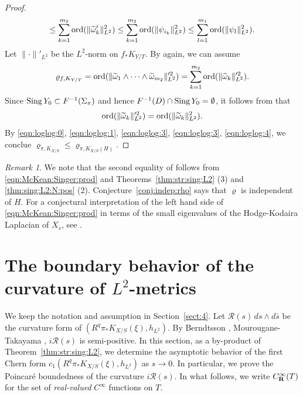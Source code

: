 \documentclass[amscd, leqno]{amsart}
\theoremstyle{plain}
\theoremstyle{definition}
\theoremstyle{remark}
\newtheorem{remark}[theorem]{Remark}
\newenvironment{pf}{\begin{proof}}{\end{proof}}
\begin{document}
\begin{pf}
\begin{equation}
\leq
\sum_{k=1}^{m_{2}} {\rm ord}(  \| \widetilde{\omega}'_{k} \|_{L^{2}}^{2}) 
\leq
\sum_{k=1}^{m_{2}} {\rm ord}(  \| \psi_{i_k} \|_{L^{2}}^{2}) 
\leq 
\sum_{l=1}^{m_{1}} {\rm ord}(  \| \psi_{l} \|_{L^{2}}^{2}). 
\end{equation}
Let $\| \cdot \|'_{L^{2}}$ be the $L^{2}$-norm on $f_{*}K_{Y/T}$. By \cite[Lemma~5.2]{Takayama22} again, we can assume 
\begin{equation}
\label{eqn:loglog:3}
\varrho_{f,K_{Y/T}} 
=
{\rm ord}(\| \widetilde{\omega}_{1} \wedge\cdots\wedge \widetilde{\omega}_{m_{2}} \|_{L^{2}}^{\prime 2})
= 
\sum_{k=1}^{m_{2}} {\rm ord}(\| \widetilde{\omega}_{k}\|_{L^{2}}^{\prime 2}).
\end{equation}
Since ${\rm Sing}\,Y_{0} \subset F^{-1}(\Sigma_{\pi})$ and hence $F^{-1}(D) \cap {\rm Sing}\,Y_{0} = \emptyset$, 
it follows from \cite[Lemma\,3.4]{Takayama22} that
\begin{equation}
\label{eqn:loglog:4}
{\rm ord}(\| \widetilde{\omega}_{k}\|_{L^{2}}^{\prime 2}) = {\rm ord}(\| \widetilde{\omega}_{k}\|_{L^{2}}^{2}).
\end{equation}
By \eqref{eqn:loglog:0}, \eqref{eqn:loglog:1}, \eqref{eqn:loglog:3}, \eqref{eqn:loglog:3}, \eqref{eqn:loglog:4}, 
we conclue $\varrho_{\pi,K_{X/S}} \leq \varrho_{\pi,K_{X/S}(H)}$. 
\end{pf}


\begin{remark}
We note that the second equality of \cite[Conjecture~9.6]{DaiYoshikawa25} follows from \eqref{eqn:McKean:Singer:prod} and
Theorems~\ref{thm:str:sing:L2} (3) and \ref{thm:sing:L2:N:pos} (2). Conjecture~\ref{conj:indep:rho} says that $\varrho$ is independent of $H$. 
For a conjectural interpretation of the left hand side of \eqref{eqn:McKean:Singer:prod} in terms of the small eigenvalues of 
the Hodge-Kodaira Laplacian of $X_{s}$, see \cite[Conjecture~9.6 ]{DaiYoshikawa25}.
\end{remark}





\section
{The boundary behavior of the curvature of $L^{2}$-metrics}
\label{sect:8}
\par
We keep the notation and assumption in Section~\ref{sect:4}.
Let ${\mathcal R}(s)\,ds\wedge d\bar{s}$ be the curvature form of $(R^{q}\pi_{*}K_{X/S}(\xi), h_{L^{2}})$. 
By Berndtsson \cite{Berndtsson09}, Mourougane-Takayama \cite{MourouganeTakayama08}, $i{\mathcal R}(s)$ is semi-positive. 
In this section, as a by-product of Theorem~\ref{thm:str:sing:L2}, we determine the asymptotic behavior of the first Chern form 
$c_{1}(R^{q}\pi_{*}K_{X/S}(\xi),h_{L^{2}})$ as $s \to 0$. In particular, we prove the Poincar\'e boundedness of the curvature 
$i{\mathcal R}(s)$.
In what follows, we write $C^{\infty}_{\bf R}(T)$ for the set of {\em real-valued} $C^{\infty}$ functions on $T$.
\end{document}
